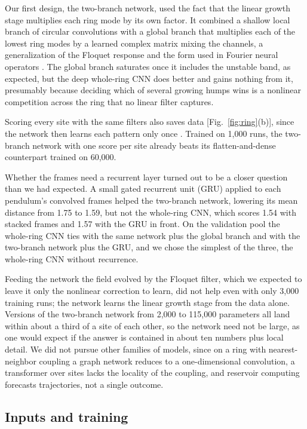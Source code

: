 \documentclass[11pt]{article}
\begin{document}
Our first design, the two-branch network, used the fact that the linear growth stage multiplies each ring mode by its own factor. It combined a shallow local branch of circular convolutions with a global branch that multiplies each of the lowest ring modes by a learned complex matrix mixing the channels, a generalization of the Floquet response and the form used in Fourier neural operators \cite{li2021fourier}. The global branch saturates once it includes the unstable band, as expected, but the deep whole-ring CNN does better and gains nothing from it, presumably because deciding which of several growing humps wins is a nonlinear competition across the ring that no linear filter captures.

Scoring every site with the same filters also saves data [Fig.~\ref{fig:ring}(b)], since the network then learns each pattern only once \cite{cohen2016group}. Trained on 1,000 runs, the two-branch network with one score per site already beats its flatten-and-dense counterpart trained on 60,000.

Whether the frames need a recurrent layer turned out to be a closer question than we had expected. A small gated recurrent unit (GRU) \cite{cho2014learning} applied to each pendulum's convolved frames helped the two-branch network, lowering its mean distance from 1.75 to 1.59, but not the whole-ring CNN, which scores 1.54 with stacked frames and 1.57 with the GRU in front. On the validation pool the whole-ring CNN ties with the same network plus the global branch and with the two-branch network plus the GRU, and we chose the simplest of the three, the whole-ring CNN without recurrence.

Feeding the network the field evolved by the Floquet filter, which we expected to leave it only the nonlinear correction to learn, did not help even with only 3,000 training runs; the network learns the linear growth stage from the data alone. Versions of the two-branch network from 2,000 to 115,000 parameters all land within about a third of a site of each other, so the network need not be large, as one would expect if the answer is contained in about ten numbers plus local detail. We did not pursue other families of models, since on a ring with nearest-neighbor coupling a graph network reduces to a one-dimensional convolution, a transformer over sites lacks the locality of the coupling, and reservoir computing \cite{Chaos_Ott_2017,PhysRevLett_Ott_2018} forecasts trajectories, not a single outcome.

\subsection{Inputs and training}
\label{sec:inputs}
\end{document}
